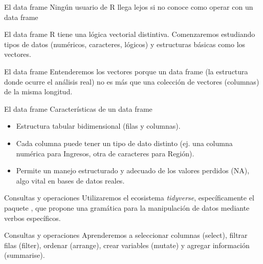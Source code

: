 \documentclass[8pt]{beamer}
\begin{document}
	
	\begin{frame}[fragile]{El data frame}
		Ningún usuario de R llega lejos si no conoce como operar con un data frame 
	\end{frame}
	
	

	\begin{frame}{El data frame}
		R tiene una lógica vectorial distintiva. Comenzaremos estudiando tipos de datos (numéricos, caracteres, lógicos) y estructuras básicas como los vectores.
	\end{frame}
	
	\begin{frame}{El data frame}
		Entenderemos los vectores porque un data frame (la estructura donde ocurre el análisis real) no es más que una colección de vectores (columnas) de la misma longitud.
	\end{frame}
	
	
	\begin{frame}{El data frame}
		Caracter\'isticas de un data frame
		
		\begin{itemize}
			\item Estructura tabular bidimensional (filas y columnas).
			
			\item Cada columna puede tener un tipo de dato distinto (ej. una columna numérica para \guillemetleft Ingresos\guillemetright , otra de caracteres para \guillemetleft Región\guillemetright ).
			
			\item Permite un manejo estructurado y adecuado de los valores perdidos (NA), algo vital en bases de datos reales.
		\end{itemize}
	\end{frame}
	
	
	
	
	\begin{frame}[fragile]{Consultas y operaciones}
		Utilizaremos el ecosistema \emph{tidyverse}, específicamente el paquete , que propone una gramática para la manipulación de datos mediante verbos específicos.
	\end{frame}
	
	
	
	\begin{frame}{Consultas y operaciones}
		Aprenderemos a seleccionar columnas (select), filtrar filas (filter), ordenar (arrange), crear variables (mutate) y agregar información (summarise).
	\end{frame}
\end{document}
